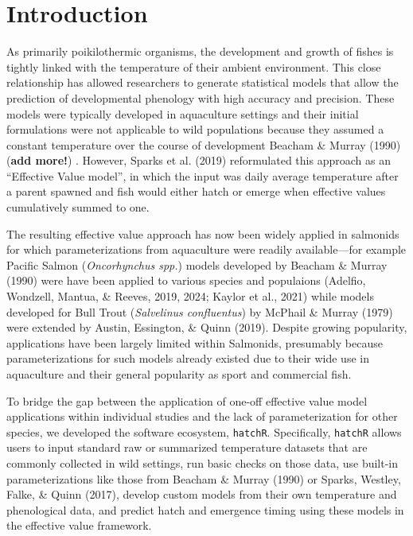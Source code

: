 \documentclass[12pt,halfline,a4paper,]{ouparticle}
\begin{document}
\section{Introduction}\label{introduction}

As primarily poikilothermic organisms, the development and growth of
fishes is tightly linked with the temperature of their ambient
environment. This close relationship has allowed researchers to generate
statistical models that allow the prediction of developmental phenology
with high accuracy and precision. These models were typically developed
in aquaculture settings and their initial formulations were not
applicable to wild populations because they assumed a constant
temperature over the course of development Beacham \& Murray (1990)
(\textbf{add more!}) . However, Sparks et al. (2019) reformulated this
approach as an ``Effective Value model'', in which the input was daily
average temperature after a parent spawned and fish would either hatch
or emerge when effective values cumulatively summed to one.

The resulting effective value approach has now been widely applied in
salmonids for which parameterizations from aquaculture were readily
available---for example Pacific Salmon (\emph{Oncorhynchus spp.}) models
developed by Beacham \& Murray (1990) were have been applied to various
species and populaions (Adelfio, Wondzell, Mantua, \& Reeves, 2019,
2024; Kaylor et al., 2021) while models developed for Bull Trout
(\emph{Salvelinus confluentus}) by McPhail \& Murray (1979) were
extended by Austin, Essington, \& Quinn (2019). Despite growing
popularity, applications have been largely limited within Salmonids,
presumably because parameterizations for such models already existed due
to their wide use in aquaculture and their general popularity as sport
and commercial fish.

To bridge the gap between the application of one-off effective value
model applications within individual studies and the lack of
parameterization for other species, we developed the software ecosystem,
\texttt{hatchR}. Specifically, \texttt{hatchR} allows users to input
standard raw or summarized temperature datasets that are commonly
collected in wild settings, run basic checks on those data, use built-in
parameterizations like those from Beacham \& Murray (1990) or Sparks,
Westley, Falke, \& Quinn (2017), develop custom models from their own
temperature and phenological data, and predict hatch and emergence
timing using these models in the effective value framework.
\end{document}
